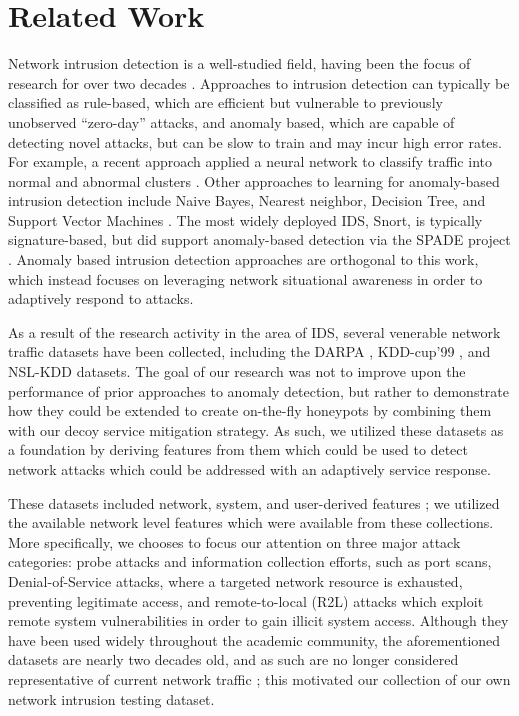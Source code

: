 \section{Related Work}
\label{related}

Network intrusion detection is a well-studied field, having been the focus of research for over two decades \cite{roesch1999snort, wang2004anomalous}. Approaches to intrusion detection can
typically be classified as rule-based, which are efficient but vulnerable to previously unobserved ``zero-day'' attacks, and anomaly based, which are capable of detecting novel attacks, but can be slow to
train and may incur high error rates. For example, a recent approach applied a neural network to classify traffic into normal and abnormal clusters \cite{NeuralNetBase}. Other approaches to learning for 
anomaly-based intrusion detection include Naive Bayes, Nearest neighbor, Decision Tree, and Support Vector Machines \cite{DMnIDS}. The most widely deployed IDS, Snort, is typically signature-based, but 
did support anomaly-based detection via the SPADE project \cite{SPADE}. Anomaly based intrusion detection approaches are orthogonal to this work, which instead focuses on leveraging network situational
awareness in order to adaptively respond to attacks.

As a result of the research activity in the area of IDS, several venerable network traffic datasets have been collected, including the DARPA \cite{DARPAdataset},  KDD-cup'99 \cite{tavallaee2009detailed},
and NSL-KDD \cite{lakhina2010feature} datasets. The goal of our research was not to improve upon the performance of prior approaches to anomaly detection, but rather to demonstrate how they could be
extended to create on-the-fly honeypots by combining them with our decoy service mitigation strategy. As such, we utilized these datasets as a foundation by deriving features from them which could be used
to detect network attacks which could be addressed with an adaptively service response. 

These datasets included network, system, and user-derived features \cite{AnalysisofNetfeatures}; we utilized the
available network level features which were available from these collections. More specifically, we chooses to focus our attention on three major attack categories: probe attacks and information collection
efforts, such as port scans, Denial-of-Service attacks, where a targeted network resource is exhausted, preventing legitimate access, and remote-to-local (R2L) attacks which exploit remote system
vulnerabilities in order to gain illicit system access. Although they have been used widely throughout the academic community, the aforementioned datasets are nearly two decades old, and as such are no
longer considered representative of current network traffic \cite{KDDharmful}; this motivated our collection of our own network intrusion testing dataset.

